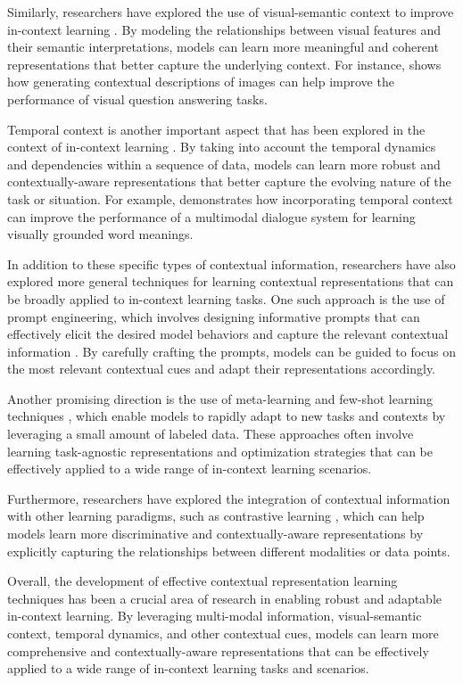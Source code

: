 \documentclass[11pt]{article}
\begin{document}
Similarly, researchers have explored the use of visual-semantic context to improve in-context learning \cite{ref125,ref126,ref127}. By modeling the relationships between visual features and their semantic interpretations, models can learn more meaningful and coherent representations that better capture the underlying context. For instance, \cite{ref125} shows how generating contextual descriptions of images can help improve the performance of visual question answering tasks.

Temporal context is another important aspect that has been explored in the context of in-context learning \cite{ref128,ref39,ref11}. By taking into account the temporal dynamics and dependencies within a sequence of data, models can learn more robust and contextually-aware representations that better capture the evolving nature of the task or situation. For example, \cite{ref128} demonstrates how incorporating temporal context can improve the performance of a multimodal dialogue system for learning visually grounded word meanings.

In addition to these specific types of contextual information, researchers have also explored more general techniques for learning contextual representations that can be broadly applied to in-context learning tasks. One such approach is the use of prompt engineering, which involves designing informative prompts that can effectively elicit the desired model behaviors and capture the relevant contextual information \cite{ref39,ref129,ref130}. By carefully crafting the prompts, models can be guided to focus on the most relevant contextual cues and adapt their representations accordingly.

Another promising direction is the use of meta-learning and few-shot learning techniques \cite{ref39,ref35}, which enable models to rapidly adapt to new tasks and contexts by leveraging a small amount of labeled data. These approaches often involve learning task-agnostic representations and optimization strategies that can be effectively applied to a wide range of in-context learning scenarios.

Furthermore, researchers have explored the integration of contextual information with other learning paradigms, such as contrastive learning \cite{ref131,ref131}, which can help models learn more discriminative and contextually-aware representations by explicitly capturing the relationships between different modalities or data points.

Overall, the development of effective contextual representation learning techniques has been a crucial area of research in enabling robust and adaptable in-context learning. By leveraging multi-modal information, visual-semantic context, temporal dynamics, and other contextual cues, models can learn more comprehensive and contextually-aware representations that can be effectively applied to a wide range of in-context learning tasks and scenarios.
\end{document}
